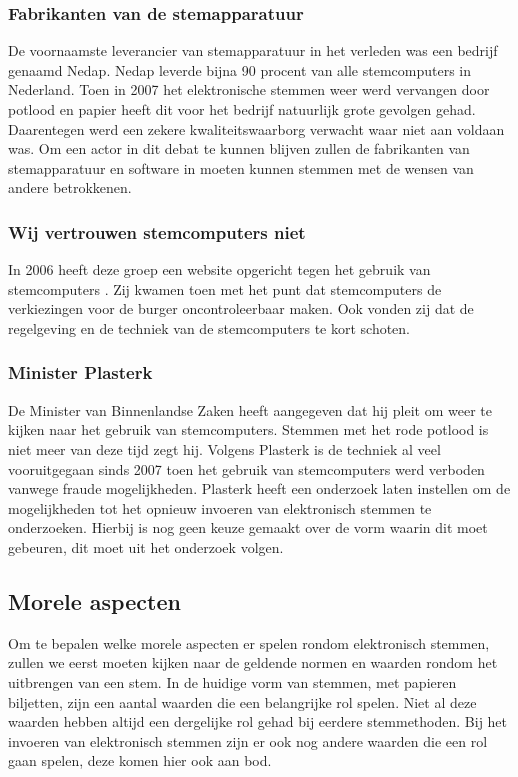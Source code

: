\documentclass[a4paper]{article}
\begin{document}
\subsubsection{Fabrikanten van de stemapparatuur}
De voornaamste leverancier van stemapparatuur in het verleden was een bedrijf genaamd Nedap.
Nedap leverde bijna 90 procent van alle stemcomputers in Nederland.
Toen in 2007 het elektronische stemmen weer werd vervangen door potlood en papier heeft dit voor het bedrijf natuurlijk grote gevolgen gehad.
Daarentegen werd een zekere kwaliteitswaarborg verwacht waar niet aan voldaan was.
Om een actor in dit debat te kunnen blijven zullen de fabrikanten van stemapparatuur en software in moeten kunnen stemmen met de wensen van andere betrokkenen.

\subsubsection{Wij vertrouwen stemcomputers niet}
In 2006 heeft deze groep een website opgericht tegen het gebruik van stemcomputers \cite{wijvertrouwenstemcomputersniet}. 
Zij kwamen toen met het punt dat stemcomputers de verkiezingen voor de burger oncontroleerbaar maken.
Ook vonden zij dat de regelgeving en de techniek van de stemcomputers te kort schoten.

\subsubsection{Minister Plasterk}
De Minister van Binnenlandse Zaken heeft aangegeven dat hij pleit om weer te kijken naar het gebruik van stemcomputers.
Stemmen met het rode potlood is niet meer van deze tijd zegt hij. 
Volgens Plasterk is de techniek al veel vooruitgegaan sinds 2007 toen het gebruik van stemcomputers werd verboden vanwege fraude mogelijkheden.
Plasterk heeft een onderzoek laten instellen om de mogelijkheden tot het opnieuw invoeren van elektronisch stemmen te onderzoeken.
Hierbij is nog geen keuze gemaakt over de vorm waarin dit moet gebeuren, dit moet uit het onderzoek volgen.

\subsection{Morele aspecten}
\label{text:moreel}
Om te bepalen welke morele aspecten er spelen rondom elektronisch stemmen, zullen we eerst moeten kijken naar de geldende normen en waarden rondom het uitbrengen van een stem.
In de huidige vorm van stemmen, met papieren biljetten, zijn een aantal waarden die een belangrijke rol spelen.
Niet al deze waarden hebben altijd een dergelijke rol gehad bij eerdere stemmethoden.
Bij het invoeren van elektronisch stemmen zijn er ook nog andere waarden die een rol gaan spelen, deze komen hier ook aan bod.
\end{document}
